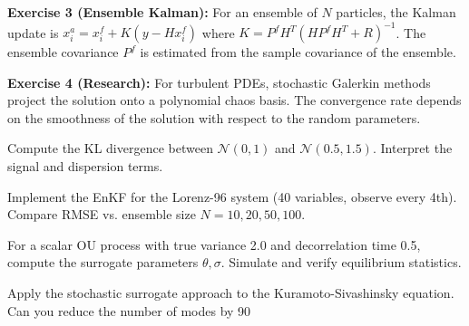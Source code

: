 \begin{solution}
\textbf{Exercise 3 (Ensemble Kalman):} For an ensemble of $N$ particles, the Kalman update is $x_i^a = x_i^f + K(y - Hx_i^f)$ where $K = P^f H^T(HP^fH^T + R)^{-1}$. The ensemble covariance $P^f$ is estimated from the sample covariance of the ensemble.
\end{solution}

\begin{solution}
\textbf{Exercise 4 (Research):} For turbulent PDEs, stochastic Galerkin methods project the solution onto a polynomial chaos basis. The convergence rate depends on the smoothness of the solution with respect to the random parameters.
\end{solution}

\label{sec:uq:exercises}

\begin{exercise}
Compute the KL divergence between $\mathcal{N}(0, 1)$ and $\mathcal{N}(0.5, 1.5)$. Interpret the signal and dispersion terms.
\end{exercise}

\begin{exercise}
Implement the EnKF for the Lorenz-96 system (40 variables, observe every 4th). Compare RMSE vs. ensemble size $N = 10, 20, 50, 100$.
\end{exercise}

\begin{exercise}
For a scalar OU process with true variance 2.0 and decorrelation time 0.5, compute the surrogate parameters $\theta, \sigma$. Simulate and verify equilibrium statistics.
\end{exercise}

\begin{exercise}[Research]
Apply the stochastic surrogate approach to the Kuramoto-Sivashinsky equation. Can you reduce the number of modes by 90%
\end{exercise}